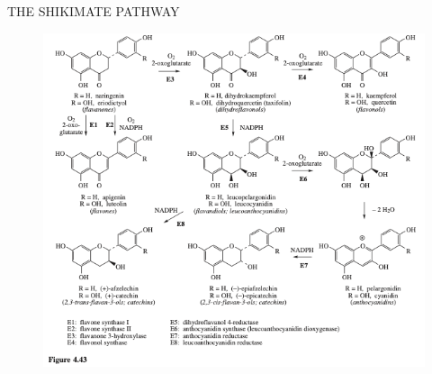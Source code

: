 \documentclass[11pt]{beamer}
\begin{document}
\begin{frame}{THE SHIKIMATE PATHWAY}
	\begin{figure}
		\centering
		\includegraphics[scale=0.3]{Figure 4.43.png}
	\end{figure}
\end{frame}
\end{document}
